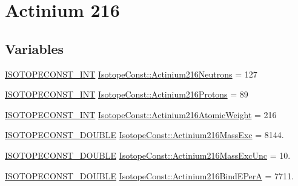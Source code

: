\hypertarget{group___isotope_const-_actinium-_ac216}{}\section{Actinium 216}
\label{group___isotope_const-_actinium-_ac216}
\subsection*{Variables}
\begin{DoxyCompactItemize}
\item 
\mbox{\hyperlink{group___isotope_const-_macros_ga5f18360b3e99483a35c32d789e62621c}{I\+S\+O\+T\+O\+P\+E\+C\+O\+N\+S\+T\+\_\+\+I\+NT}} \mbox{\hyperlink{group___isotope_const-_actinium-_ac216_ga56d1a4c76811080682cd55c495079216}{Isotope\+Const\+::\+Actinium216\+Neutrons}} = 127
\item 
\mbox{\hyperlink{group___isotope_const-_macros_ga5f18360b3e99483a35c32d789e62621c}{I\+S\+O\+T\+O\+P\+E\+C\+O\+N\+S\+T\+\_\+\+I\+NT}} \mbox{\hyperlink{group___isotope_const-_actinium-_ac216_ga7cfec647dc089a8136d7b1a391149b4d}{Isotope\+Const\+::\+Actinium216\+Protons}} = 89
\item 
\mbox{\hyperlink{group___isotope_const-_macros_ga5f18360b3e99483a35c32d789e62621c}{I\+S\+O\+T\+O\+P\+E\+C\+O\+N\+S\+T\+\_\+\+I\+NT}} \mbox{\hyperlink{group___isotope_const-_actinium-_ac216_ga646ea47011d7a92fdb21bc4867c590bf}{Isotope\+Const\+::\+Actinium216\+Atomic\+Weight}} = 216
\item 
\mbox{\hyperlink{group___isotope_const-_macros_ga8f45a7272ce02c0b4c65c44636ed719a}{I\+S\+O\+T\+O\+P\+E\+C\+O\+N\+S\+T\+\_\+\+D\+O\+U\+B\+LE}} \mbox{\hyperlink{group___isotope_const-_actinium-_ac216_ga0672ff8f92e8c29120cfe064d032ba25}{Isotope\+Const\+::\+Actinium216\+Mass\+Exc}} = 8144.
\item 
\mbox{\hyperlink{group___isotope_const-_macros_ga8f45a7272ce02c0b4c65c44636ed719a}{I\+S\+O\+T\+O\+P\+E\+C\+O\+N\+S\+T\+\_\+\+D\+O\+U\+B\+LE}} \mbox{\hyperlink{group___isotope_const-_actinium-_ac216_ga89349ecb388bc9ff6df13ec9121f1cdc}{Isotope\+Const\+::\+Actinium216\+Mass\+Exc\+Unc}} = 10.
\item 
\mbox{\hyperlink{group___isotope_const-_macros_ga8f45a7272ce02c0b4c65c44636ed719a}{I\+S\+O\+T\+O\+P\+E\+C\+O\+N\+S\+T\+\_\+\+D\+O\+U\+B\+LE}} \mbox{\hyperlink{group___isotope_const-_actinium-_ac216_ga461852ec63fa67aa6681cfb489bc232c}{Isotope\+Const\+::\+Actinium216\+Bind\+E\+PerA}} = 7711.
\item 

\end{DoxyCompactItemize}
